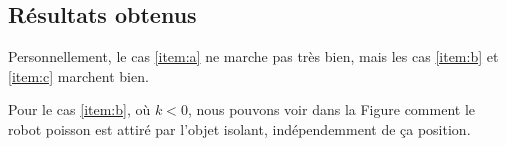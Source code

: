 \subsection{Résultats obtenus}

Personnellement, le cas \ref{item:a} ne marche pas très bien, mais les cas \ref{item:b} et \ref{item:c} marchent bien. 

Pour le cas \ref{item:b}, où $k < 0$, nous pouvons voir dans la Figure comment le robot poisson est attiré par l'objet isolant, indépendemment de ça position. 